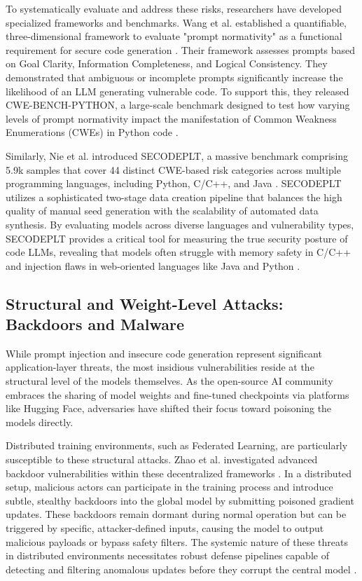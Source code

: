 \documentclass[11pt,a4paper]{article}
\begin{document}
To systematically evaluate and address these risks, researchers have developed specialized frameworks and benchmarks. Wang et al. established a quantifiable, three-dimensional framework to evaluate "prompt normativity" as a functional requirement for secure code generation \cite{Wang_2025_Prompt}. Their framework assesses prompts based on Goal Clarity, Information Completeness, and Logical Consistency. They demonstrated that ambiguous or incomplete prompts significantly increase the likelihood of an LLM generating vulnerable code. To support this, they released CWE-BENCH-PYTHON, a large-scale benchmark designed to test how varying levels of prompt normativity impact the manifestation of Common Weakness Enumerations (CWEs) in Python code \cite{Wang_2025_Prompt}.

Similarly, Nie et al. introduced SECODEPLT, a massive benchmark comprising 5.9k samples that cover 44 distinct CWE-based risk categories across multiple programming languages, including Python, C/C++, and Java \cite{Nie_2025_Secodeplt}. SECODEPLT utilizes a sophisticated two-stage data creation pipeline that balances the high quality of manual seed generation with the scalability of automated data synthesis. By evaluating models across diverse languages and vulnerability types, SECODEPLT provides a critical tool for measuring the true security posture of code LLMs, revealing that models often struggle with memory safety in C/C++ and injection flaws in web-oriented languages like Java and Python \cite{Nie_2025_Secodeplt}.

\subsection{Structural and Weight-Level Attacks: Backdoors and Malware}

While prompt injection and insecure code generation represent significant application-layer threats, the most insidious vulnerabilities reside at the structural level of the models themselves. As the open-source AI community embraces the sharing of model weights and fine-tuned checkpoints via platforms like Hugging Face, adversaries have shifted their focus toward poisoning the models directly. 

Distributed training environments, such as Federated Learning, are particularly susceptible to these structural attacks. Zhao et al. investigated advanced backdoor vulnerabilities within these decentralized frameworks \cite{Zhao_2026_Protegofed}. In a distributed setup, malicious actors can participate in the training process and introduce subtle, stealthy backdoors into the global model by submitting poisoned gradient updates. These backdoors remain dormant during normal operation but can be triggered by specific, attacker-defined inputs, causing the model to output malicious payloads or bypass safety filters. The systemic nature of these threats in distributed environments necessitates robust defense pipelines capable of detecting and filtering anomalous updates before they corrupt the central model \cite{Zhao_2026_Protegofed}.
\end{document}
